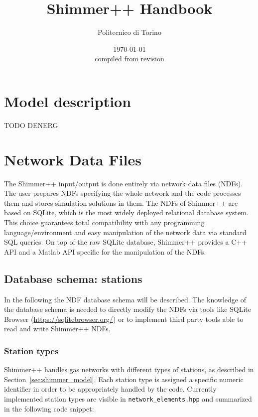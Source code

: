 \documentclass[10pt]{article}
\title{Shimmer++ Handbook}
\author{Politecnico di Torino}
\date{\today\\{\footnotesize compiled from revision \texttt{\gitrevision}}}
\begin{document}
\maketitle
\tableofcontents

\section{Model description}
TODO DENERG
\section{Network Data Files}
The Shimmer++ input/output is done entirely via network data files (NDFs). The
user prepares NDFs specifying the whole network and the code processes them and
stores simulation solutions in them.
The NDFs of Shimmer++ are based on SQLite, which is the
most widely deployed relational database system. This choice guarantees total
compatibility with any programming language/environment and easy manipulation of
the network data via standard SQL queries. On top of the raw SQLite database, Shimmer++ provides a C++
API and a Matlab API specific for the manipulation of the NDFs.

\subsection{Database schema: stations}
In the following the NDF database schema will be described. The knowledge of
the database schema is needed to directly modify the NDFs via tools like
SQLite Browser (\url{https://sqlitebrowser.org/}) or to implement third party
tools able to read and write Shimmer++ NDFs.

\subsubsection{Station types}
Shimmer++ handles gas networks with different types of stations, as described
in Section~\ref{sec:shimmer_model}. Each station type is assigned a specific
numeric identifier in order to be appropriately handled by the code. Currently
implemented station types are visible in \texttt{network\_elements.hpp} and
summarized in the following code snippet: 
\end{document}
